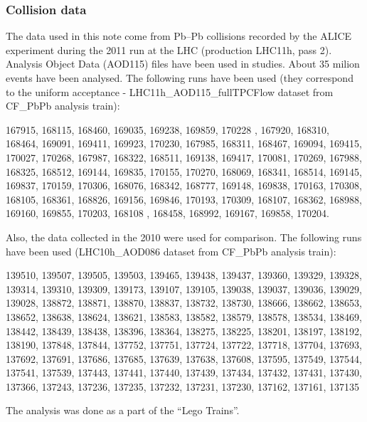 \subsubsection{Collision data}
The data used in this note come from Pb--Pb collisions recorded by the ALICE experiment during the 2011 run at the LHC (production LHC11h, pass 2). Analysis Object Data (AOD115) files have been used in studies. About 35 milion events have been analysed. The following runs have been used
(they correspond to the uniform acceptance - LHC11h\_AOD115\_fullTPCFlow dataset from  CF\_PbPb analysis train):

167915, 168115, 168460, 169035, 169238, 169859, 170228 , 167920, 168310, 168464, 169091, 169411, 169923, 170230, 167985, 168311, 168467, 169094, 169415, 170027, 170268, 167987, 168322, 168511, 169138, 169417, 170081, 170269, 167988, 168325, 168512, 169144, 169835, 170155, 170270, 168069, 168341, 168514, 169145, 169837, 170159, 170306, 168076, 168342, 168777, 169148, 169838, 170163, 170308, 168105, 168361, 168826, 169156, 169846, 170193, 170309, 168107, 168362, 168988, 169160, 169855, 170203, 168108 , 168458, 168992, 169167, 169858, 170204.

Also, the data collected in the 2010 were used for comparison. The following runs have been used (LHC10h\_AOD086 dataset from  CF\_PbPb analysis train):

139510, 139507, 139505, 139503, 139465, 139438, 139437, 139360, 139329, 139328, 139314, 139310, 139309, 139173, 139107, 139105, 139038, 139037, 139036, 139029, 139028, 138872, 138871, 138870, 138837, 138732, 138730, 138666, 138662, 138653, 138652, 138638, 138624, 138621, 138583, 138582, 138579, 138578, 138534, 138469, 138442, 138439, 138438, 138396, 138364, 138275, 138225, 138201, 138197, 138192, 138190, 137848, 137844, 137752, 137751, 137724, 137722, 137718, 137704, 137693, 137692, 137691, 137686, 137685, 137639, 137638, 137608, 137595, 137549, 137544, 137541, 137539, 137443, 137441, 137440, 137439, 137434, 137432, 137431, 137430, 137366, 137243, 137236, 137235, 137232, 137231, 137230, 137162, 137161, 137135

The analysis was done as a part of the ``Lego Trains''.

